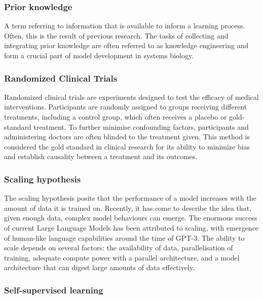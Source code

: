 \hypertarget{prior-knowledge-1}{%
\subsubsection{Prior knowledge}\label{prior-knowledge-1}}

A term referring to information that is available to inform a learning process.
Often, this is the result of previous research.
The tasks of collecting and integrating prior knowledge are often referred to as knowledge engineering and form a crucial part of model development in systems biology.

\hypertarget{randomized-clinical-trials}{%
\subsubsection{Randomized Clinical Trials}\label{randomized-clinical-trials}}

Randomized clinical trials are experiments designed to test the efficacy of medical interventions.
Participants are randomly assigned to groups receiving different treatments, including a control group, which often receives a placebo or gold-standard treatment.
To further minimise confounding factors, participants and administering doctors are often blinded to the treatment given.
This method is considered the gold standard in clinical research for its ability to minimize bias and establish causality between a treatment and its outcomes.

\hypertarget{scaling-hypothesis}{%
\subsubsection{Scaling hypothesis}\label{scaling-hypothesis}}

The scaling hypothesis posits that the performance of a model increases with the amount of data it is trained on.
Recently, it has come to describe the idea that, given enough data, complex model behaviours can emerge.
The enormous success of current Large Language Models has been attributed to scaling, with emergence of human-like language capabilities around the time of GPT-3.
The ability to scale depends on several factors: the availability of data, parallelisation of training, adequate compute power with a parallel architecture, and a model architecture that can digest large amounts of data effectively.

\hypertarget{self-supervised-learning}{%
\subsubsection{Self-supervised learning}\label{self-supervised-learning}}

